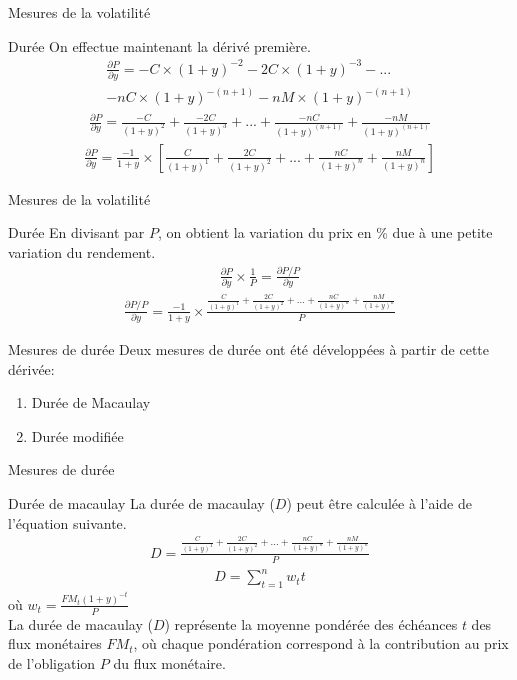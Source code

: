 \documentclass{beamer}
\begin{document}
\begin{frame}{Mesures de la volatilité}
\begin{block}{Durée}
On effectue maintenant la dérivé première.
\begin{align*}
\frac{\partial P}{\partial y}=-C \times (1+y)^{-2}-2C \times (1+y)^{-3}-...\\-nC \times (1+y)^{-(n+1)}-nM \times (1+y)^{-(n+1)}
\end{align*}
\begin{align*}
\frac{\partial P}{\partial y}=\frac{-C}{(1+y)^2}+\frac{-2C}{(1+y)^3}+...+\frac{-nC}{(1+y)^{(n+1)}}+\frac{-nM}{(1+y)^{(n+1)}}
\end{align*}
\begin{align*}
\frac{\partial P}{\partial y}= \frac{-1}{1+y} \times \left[ \frac{C}{(1+y)^1}+\frac{2C}{(1+y)^2}+...+\frac{nC}{(1+y)^{n}}+\frac{nM}{(1+y)^{n}} \right]
\end{align*}
\end{block}
\end{frame}

\begin{frame}{Mesures de la volatilité}
\begin{block}{Durée}
En divisant par $P$, on obtient la variation du prix en \% due à une petite variation du rendement.
\begin{align*}
\frac{\partial P}{\partial y} \times \frac{1}{P}=\frac{\partial P/P}{\partial y} 
\end{align*}
\begin{align*}
\frac{\partial P/P}{\partial y} = \frac{-1}{1+y} \times \frac{\frac{C}{(1+y)^1}+\frac{2C}{(1+y)^2}+...+\frac{nC}{(1+y)^{n}}+\frac{nM}{(1+y)^{n}}}{P}
\end{align*}
\end{block}
\end{frame}

\begin{frame}{Mesures de durée}
Deux mesures de durée ont été développées à partir de cette dérivée: 
\begin{enumerate}
\item Durée de Macaulay
\item Durée modifiée
\end{enumerate}
\end{frame}

\begin{frame}{Mesures de durée}
\begin{block}{Durée de macaulay}
La durée de macaulay ($D$) peut être calculée à l'aide de l'équation suivante.
\begin{align*}
D=\frac{\frac{C}{(1+y)^1}+\frac{2C}{(1+y)^2}+...+\frac{nC}{(1+y)^{n}}+\frac{nM}{(1+y)^{n}}}{P}
\end{align*}
\begin{align*}
D=\sum_{t=1}^nw_t t
\end{align*}
où $w_t=\frac{FM_t (1+y)^{-t}}{P}$\\
La durée de macaulay ($D$) représente la moyenne pondérée des échéances $t$ des flux monétaires $FM_t$, où chaque pondération correspond à la contribution au prix de l’obligation $P$ du flux monétaire.
\end{block}
\end{frame}
\end{document}
